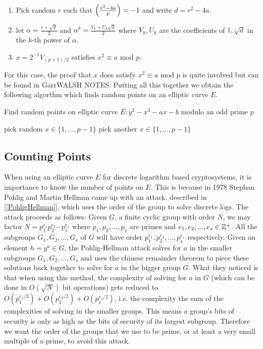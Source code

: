 \begin{enumerate}[1.]
	\item Pick random $r$ such that $\left(\frac{r^2 - 4a}{p}\right) =  -1 $ and write $d = r^2 - 4a$.
	\item let $\alpha = \frac{r+\sqrt{d}}{2}$ and $\alpha^k = \frac{V_k + U_k \sqrt{d}}{2}$ where $V_k,U_k$ are the coefficients of $1, \sqrt{d}$ in the $k$-th power of $\alpha$. 
	\item $x =  2^{-1}V_{(p+1)/2}$ satisfies $x^2 \equiv a $ mod $p$. 
\end{enumerate}

For this case, the proof that $x$ does satisfy $x^2 \equiv a $ mod $p$ is quite involved but can be found in {\color{red} GarrWALSH NOTES}. Putting all this together we obtain the following algorthm which finds random points on an elliptic curve $E$. \\ 

\begin{algorithm} 
	\caption{Find random points on elliptic curve $E : y^2 - x^3 - ax - b$ modulo an odd prime $p$ }
	\begin{algorithmic}[1]
			\State pick random $x \in \lbrace 1, \dots , p-1 \rbrace $
				\State pick another $x \in  \lbrace 1, \dots , p-1 \rbrace $
			\EndWhile
	  	\EndFunction
	\end{algorithmic} 
\end{algorithm} 


\subsection{Counting Points}

When using an elliptic curve $E$ for discrete logarithm based cryptosystems, it is importance to know the number of points on $E$. This is because in 1978 Stephan Pohlig and Martin Hellman came up with an attack, described in [\ref{PohligHellman}], which uses the order of the group to solve discrete logs. The attack proceeds as follows: Given $G$, a finite cyclic group with order $N$, we may factor $N = p_1^{e_1}p_2^{e_2} \cdots p_s^{e_s}$ where $p_1,p_2,...,p_s$ are primes and $e_1,e_2,...,e_s \in \mathbb{Z}^+ $. All the subgroups $G_1,G_2,...,G_s$ of $G$ will have order $p_1^{e_1},p_2^{e_2},...,p_s^{e_s}$ respectively. Given an element $h = g^a \in G$, the Pohlig-Hellman attack solves for $a$ in the smaller subgroups $G_1,G_2,...,G_s$ and uses the chinese remainder theorem to piece these solutions back together to solve for $a$ in the bigger group $G$. What they noticed is that when using this method, the complexity of solving for $a$ in $G$ (which can be done in $O(\sqrt{N})$ bit operations) gets reduced to $O(p_1^{e_1/2}) + O(p_2^{e_2/2}) + O(p_s^{e_s/2})$, i.e. the complexity the sum of the complexities of solving in the smaller groups. This means a group's bits of security is only as high as the bits of security of its largest subgroup. Therefore we want the order of the groups that we use to be prime, or at least a very small multiple of a prime, to avoid this attack. \\

